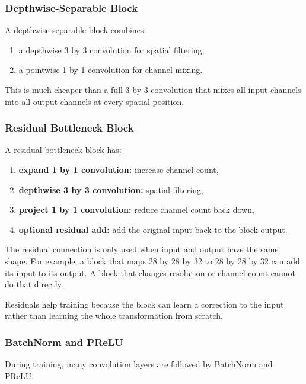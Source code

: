 \documentclass[11pt]{article}
\begin{document}
\subsubsection{Depthwise-Separable Block}

A depthwise-separable block combines:

\begin{enumerate}[leftmargin=1.6em]
  \item a depthwise 3 by 3 convolution for spatial filtering,
  \item a pointwise 1 by 1 convolution for channel mixing.
\end{enumerate}

This is much cheaper than a full 3 by 3 convolution that mixes all input channels into all output channels at every spatial position.

\subsubsection{Residual Bottleneck Block}

A residual bottleneck block has:

\begin{enumerate}[leftmargin=1.6em]
  \item \textbf{expand 1 by 1 convolution:} increase channel count,
  \item \textbf{depthwise 3 by 3 convolution:} spatial filtering,
  \item \textbf{project 1 by 1 convolution:} reduce channel count back down,
  \item \textbf{optional residual add:} add the original input back to the block output.
\end{enumerate}

The residual connection is only used when input and output have the same shape.
For example, a block that maps 28 by 28 by 32 to 28 by 28 by 32 can add its input to its output.
A block that changes resolution or channel count cannot do that directly.

Residuals help training because the block can learn a correction to the input rather than learning the whole transformation from scratch.

\subsubsection{BatchNorm and PReLU}

During training, many convolution layers are followed by BatchNorm and PReLU.
\end{document}
